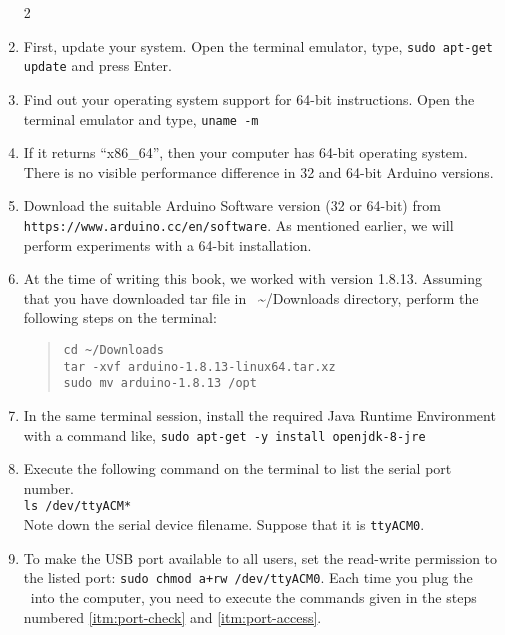 \begin{enumerate}
      \setcounter{enumi}2
      \item First, update your system. Open the terminal emulator, type,
            {\tt sudo apt-get update} and press Enter. 
      \item Find out your operating system support for 64-bit
            instructions. Open the terminal emulator and type, {\tt uname -m}
      \item If it returns ``x86\_64'', then your computer has 64-bit
            operating system.   There is no visible performance difference in 32
            and 64-bit Arduino versions.
      \item Download the suitable Arduino Software version (32 or 64-bit)
            from \\ {\tt https://www.arduino.cc/en/software}.  As mentioned
            earlier, we will perform experiments with a 64-bit installation.
            
      \item At the time of writing this book, we worked with version 1.8.13.
            Assuming that you have downloaded tar file in~
            {\large \textasciitilde}/Downloads directory, perform the following
            steps on the terminal:
            \begin{quote}
                  {\tt cd {\large\textasciitilde}/Downloads\\
                        tar -xvf arduino-1.8.13-linux64.tar.xz\\
                        sudo mv arduino-1.8.13 /opt}
            \end{quote}
            
      \item In the same terminal session, install the required Java Runtime
            Environment with a command like,
            {\tt sudo apt-get -y install openjdk-8-jre}
            
      \item \label{itm:port-check} Execute the
            following command on the terminal to list the serial port number.\\
            {\tt ls /dev/ttyACM*}\\
            Note down the serial device filename.  Suppose that it
            is {\tt ttyACM0}.
      \item \label{itm:port-access} To make the USB port available to all users, set the read-write
            permission to the listed port:
            {\tt sudo chmod a+rw /dev/ttyACM0}. Each time you plug the \arduino\
            into the computer, you need to execute the commands given in the steps 
            numbered \ref{itm:port-check} and \ref{itm:port-access}. 
            

\end{enumerate}
